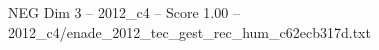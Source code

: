 \begin{textsample}{NEG Dim 3 – 2012\_c4 – Score 1.00 – 2012\_c4/enade\_2012\_tec\_gest\_rec\_hum\_c62ecb317d.txt}
\end{textsample}

